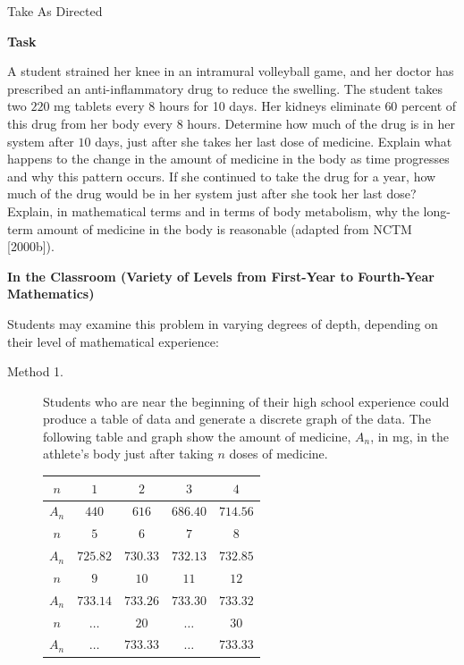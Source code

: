
\TriExample
  {
    Take As Directed
  }
  {
    \textbf{Task}

    A student strained her knee in an intramural volleyball game, and her doctor has prescribed an anti-inflammatory drug to reduce the swelling. The student takes two $220$ mg tablets every $8$ hours for 10 days. Her kidneys eliminate $60$ percent of this drug from her body every $8$ hours. Determine how much of the drug is in her system after $10$ days, just after she takes her last dose of medicine. Explain what happens to the change in the amount of medicine in the body as time progresses and why this pattern occurs. If she continued to take the drug for a year, how much of the drug would be in her system just after she took her last dose? Explain, in mathematical terms and in terms of body metabolism, why the long-term amount of medicine in the body is reasonable (adapted from NCTM [2000b]).

    \textbf{In the Classroom (Variety of Levels from First-Year to Fourth-Year Mathematics)}

    Students may examine this problem in varying degrees of depth, depending on their level of mathematical experience:

    \begin{description}
      \item[Method 1.] Students who are near the beginning of their high school experience could produce a table of data and generate a discrete graph of the data. The following table and graph show the amount of medicine, $A_n$, in mg, in the athlete's body just after taking $n$ doses of medicine.
      
      \begin{center}
      \setlength{\tabcolsep}{5pt}
      \begin{tabular}{|c|c|c|c|c|}
      \hline
      $n$   & $1$      & $2$      & $3$      & $4$      \\
      \hline
      $A_n$ & $440$    & $616$    & $686.40$ & $714.56$ \\
      \hline
      $n$   & $5$      & $6$      & $7$      & $8$      \\
      \hline
      $A_n$ & $725.82$ & $730.33$ & $732.13$ & $732.85$ \\
      \hline
      $n$   & $9$      & $10$     & $11$     & $12$     \\
      \hline
      $A_n$ & $733.14$ & $733.26$ & $733.30$ & $733.32$ \\
      \hline
      $n$   & $\dots$  & $20$     & $\dots$  & $30$     \\
      \hline
      $A_n$ & $\dots$  & $733.33$ & $\dots$  & $733.33$ \\
      \hline
      \end{tabular}
      \end{center}
      

\end{description}}
